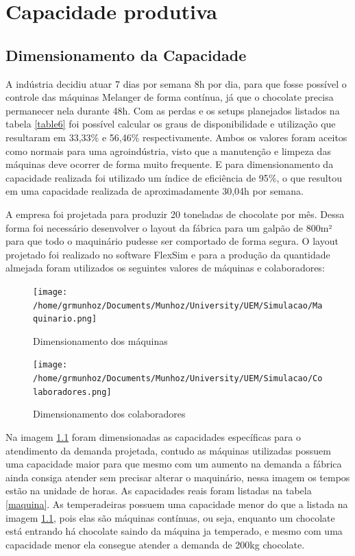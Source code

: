 \documentclass[
	12pt,				%
	openright,			%
	oneside,			%
	a4paper,			%
	english,			%
	french,				%
	spanish,			%
	brazil				%
	]{abntex2}
\begin{document}
\newpage
\chapter{Capacidade produtiva}

\section{Dimensionamento da Capacidade}

A indústria decidiu atuar 7 dias por semana 8h por dia, para que fosse possível o controle das máquinas Melanger de forma contínua, já que o chocolate precisa permanecer nela durante 48h. Com as perdas e os setups planejados listados na tabela \ref{table6} foi possível calcular os graus de disponibilidade e utilização que resultaram em 33,33$\%$ e 56,46$\%$ respectivamente. Ambos os valores foram aceitos como normais para uma agroindústria, visto que a manutenção e limpeza das máquinas deve ocorrer de forma muito frequente. E para dimensionamento da capacidade realizada foi utilizado um índice de eficiência de 95$\%$, o que resultou em uma capacidade realizada de aproximadamente 30,04h por semana.

A empresa foi projetada para produzir 20 toneladas de chocolate por mês. Dessa forma foi necessário desenvolver o layout da fábrica para um galpão de 800m² para que todo o maquinário pudesse ser comportado de forma segura. O layout projetado foi realizado no software FlexSim e para a produção da quantidade almejada foram utilizados os seguintes valores de máquinas e colaboradores:

\begin{figure}[H]
\begin{center}
\caption{Dimensionamento dos máquinas}
\texttt{[image: /home/grmunhoz/Documents/Munhoz/University/UEM/Simulacao/Maquinario.png]} 
\label{maq}
\end{center}
\end{figure}

\begin{figure}[H]
\begin{center}
\caption{Dimensionamento dos colaboradores}
\texttt{[image: /home/grmunhoz/Documents/Munhoz/University/UEM/Simulacao/Colaboradores.png]} 
\end{center}
\end{figure}

Na imagem \ref{maq} foram dimensionadas as capacidades específicas para o atendimento da demanda projetada, contudo as máquinas utilizadas possuem uma capacidade maior para que mesmo com um aumento na demanda a fábrica ainda consiga atender sem precisar alterar o maquinário, nessa imagem os tempos estão na unidade de horas. As capacidades reais foram listadas na tabela \ref{maquina}. As temperadeiras possuem uma capacidade menor do que a listada na imagem \ref{maq}, pois elas são máquinas contínuas, ou seja, enquanto um chocolate está entrando há chocolate saindo da máquina ja temperado, e mesmo com uma capacidade menor ela consegue atender a demanda de 200kg chocolate.
\end{document}
